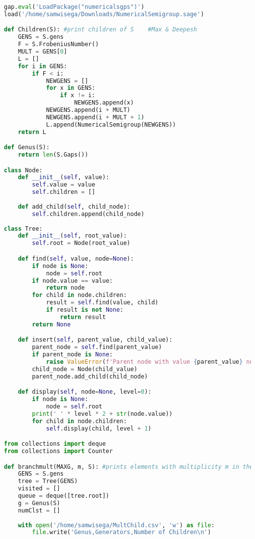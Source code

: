 \begin{lstlisting}[language=python]
gap.eval('LoadPackage("numericalsgps")')
load('/home/samwisega/Downloads/NumericalSemigroup.sage')

def Children(S): #print children of S    #Max & Deepesh
    GENS = S.gens 
    F = S.FrobeniusNumber() 
    MULT = GENS[0]
    L = []
    for i in GENS: 
        if F < i: 
            NEWGENS = []
            for x in GENS: 
                if x != i: 
                    NEWGENS.append(x)
            NEWGENS.append(i + MULT)
            NEWGENS.append(i + MULT + 1)
            L.append(NumericalSemigroup(NEWGENS))
    return L   

def Genus(S): 
    return len(S.Gaps())

class Node:
    def __init__(self, value):
        self.value = value
        self.children = []
        
    def add_child(self, child_node):
        self.children.append(child_node)
        
class Tree:
    def __init__(self, root_value):
        self.root = Node(root_value)

    def find(self, value, node=None):
        if node is None:
            node = self.root
        if node.value == value:
            return node
        for child in node.children:
            result = self.find(value, child)
            if result is not None:
                return result
        return None

    def insert(self, parent_value, child_value):
        parent_node = self.find(parent_value)
        if parent_node is None:
            raise ValueError(f'Parent node with value {parent_value} not found.')
        child_node = Node(child_value)
        parent_node.add_child(child_node)    

    def display(self, node=None, level=0):
        if node is None:
            node = self.root
        print(' ' * level * 2 + str(node.value))
        for child in node.children:
            self.display(child, level + 1)

from collections import deque 
from collections import Counter

def branchmult(MAXG, m, S): #prints elements with multiplicity m in the num sgp tree starting at S
    GENS = S.gens
    tree = Tree(GENS)
    visited = []
    queue = deque([tree.root])
    g = Genus(S)
    numClst = []
    
    with open('/home/samwisega/MultChild.csv', 'w') as file:
        file.write('Genus,Generators,Number of Children\n')
        

\end{lstlisting}
